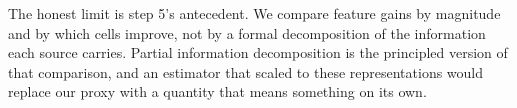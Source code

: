 The honest limit is step 5's antecedent. We compare feature gains by
magnitude and by which cells improve, not by a formal decomposition of the
information each source carries. Partial information decomposition
\citep{williams2010nonnegative,liang2023quantifying} is the principled
version of that comparison, and an estimator that scaled to these
representations would replace our proxy with a quantity that means
something on its own.
